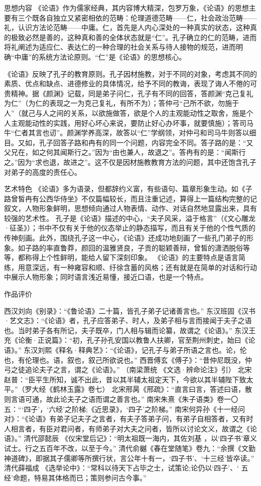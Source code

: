 \documentclass[a4paper,12pt,UTF8,twoside]{ctexbook}
\begin{document}
思想内容
《论语》作为儒家经典，其内容博大精深，包罗万象，《论语》的思想主要有三个既各自独立又紧密相依的范畴：伦理道德范畴——仁，社会政治范畴——礼，认识方法论范畴——中庸。仁，首先是人内心深处的一种真实的状态，这种真的极致必然是善的，这种真和善的全体状态就是“仁”。孔子确立的仁的范畴，进而将礼阐述为适应仁、表达仁的一种合理的社会关系与待人接物的规范，进而明确“中庸”的系统方法论原则。“仁”是《论语》的思想核心。

《论语》反映了孔子的教育原则。孔子因材施教，对于不同的对象，考虑其不同的素质、优点和缺点、进德修业的具体情况，给予不同的教诲，表现了诲人不倦的可贵精神。据《颜渊》记载，同是弟子问仁，孔子有不同的回答，答颜渊“克己复礼为仁”（为仁的表现之一为克己复礼，有所不为）；答仲弓“己所不欲，勿施于人”（就己与人之间的关系，以欲施做答，欲是个人的主观能动性之取舍，施是个人主观能动性的实践，用好心坏心来说，要防止好心办坏事，就要慎施）；答司马牛“仁者其言也讱”。颜渊学养高深，故答以“仁”学纲领，对仲弓和司马牛则答以细目。又如，孔子回答子路和冉有的同一个问题，内容完全不同。答子路的是：“又父兄在，如之何其闻斯行之。”因为“由也兼人，故退之”。答冉有的是：“闻斯行之。”因为“求也退，故进之”。这不仅是因材施教教育方法的问题，其中还饱含孔子对弟子的高度的责任心。

艺术特色
《论语》多为语录，但都辞约义富，有些语句、篇章形象生动。如《子路曾皙冉有公西华侍坐》不仅篇幅较长，而且注重记述，算得上一篇结构完整的记叙文，人物形象鲜明，思想倾向通过人物表情、动作、对话自然地显露出来，具有较强的艺术性。
孔子是《论语》描述的中心，“夫子风采，溢于格言”（《文心雕龙·征圣》）；书中不仅有关于他的仪态举止的静态描写，而且有关于他的个性气质的传神刻画。此外，围绕孔子这一中心，《论语》还成功地刻画了一些孔门弟子的形象。如子路的率直鲁莽，颜回的温雅贤良，子贡的聪颖善辩，曾皙的潇洒脱俗等等，都称得上个性鲜明，能给人留下深刻印象。
《论语》的主要特点是语言简练，用意深远，有一种雍容和顺、纡徐含蓄的风格；还有就是在简单的对话和行动中展示人物形象；同时语言浅近易懂，接近口语，也是一个特点。 

作品评价

西汉刘向《别录》：“《鲁论语》二十篇，皆孔子弟子记诸善言也。”
东汉班固《汉书·艺文志》：“《论语》者，孔子应答弟子、时人，及弟子相与言而接闻于夫子之语也。当时弟子各有所记，夫子既卒，门人相与辑而论纂，故谓之《论语》。”
东汉王充《论衡·正说篇》：“初，孔子孙孔安国以教鲁人扶卿，官至荆州刺史，始曰《论语》。”
东汉刘熙《释名·释典艺》：“《论语》，记孔子与弟子所语之言也。论，伦也，有伦理也。语，叙也，叙己所欲说也。”
西晋傅玄《傅子》：“昔仲尼既没，仲弓之徒追论夫子之言，谓之《论语》。” （南梁萧统 《文选·辨命论注》引）
北宋赵普：“臣平生所知，诚不出此，昔以其半辅太祖定天下，今欲以其半辅陛下致太平。”（罗大经《鹤林玉露》卷七）
北宋邢昺《邢疏》：“直言曰言，答述曰语，散则言语可通，故此论夫子之语而谓之善言也。”
南宋朱熹《朱子语类》卷一〇五：“‘四子’，‘六经’之阶梯;《近思录》，‘四子’之阶梯。”
南宋何异孙《十一经问对》：“《论语》有弟子记夫子之言者，有夫子答弟子问，有弟子自相答者，又有时人相言者，有臣对君问者，有师弟子对大夫之问者，皆所以讨论文义，故谓之《论语》。”
清代邵懿辰 《仪宋堂后记》：“明太祖既一海内，其佐刘基 ，以‘四子书’章义试士。行之五百年不改，以至于今。”
清代俞樾《春在堂随笔》卷九：“余撰《文勤神道碑》，即据其子儒卿等所撰行状，言公年十有一，‘四子书’、‘十三经’皆卒读。”
清代薛福成 《选举论中》：“常科以待天下占毕之士，试策论;论仍以‘四子’、‘ 五经’命题，特易其体格而已；策则参问古今事。” 
\end{document}
